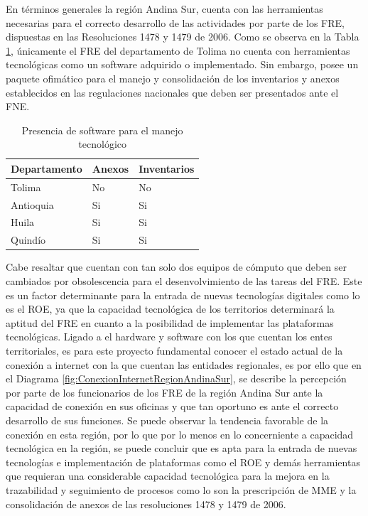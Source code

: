 \documentclass[
]{book}
\begin{document}
En términos generales la región Andina Sur, cuenta con las herramientas necesarias para el correcto desarrollo de las actividades por parte de los FRE, dispuestas en las Resoluciones 1478 y 1479 de 2006. Como se observa en la Tabla \ref{tab:softwareTecnologiaRegAndinaSur}, únicamente el FRE del departamento de Tolima no cuenta con herramientas tecnológicas como un software adquirido o implementado. Sin embargo, posee un paquete ofimático para el manejo y consolidación de los inventarios y anexos establecidos en las regulaciones nacionales que deben ser presentados ante el FNE.

\begin{longtable}[t]{lll}
\caption{\label{tab:softwareTecnologiaRegAndinaSur}Presencia de software para el manejo tecnológico}\\
\toprule
Departamento & Anexos & Inventarios\\
\midrule
Tolima & No & No\\
Antioquia & Si & Si\\
Huila & Si & Si\\
Quindío & Si & Si\\
\bottomrule
\end{longtable}

Cabe resaltar que cuentan con tan solo dos equipos de cómputo que deben ser cambiados por obsolescencia para el desenvolvimiento de las tareas del FRE. Este es un factor determinante para la entrada de nuevas tecnologías digitales como lo es el ROE, ya que la capacidad tecnológica de los territorios determinará la aptitud del FRE en cuanto a la posibilidad de implementar las plataformas tecnológicas.
Ligado a el hardware y software con los que cuentan los entes territoriales, es para este proyecto fundamental conocer el estado actual de la conexión a internet con la que cuentan las entidades regionales, es por ello que en el Diagrama \ref{fig:ConexionInternetRegionAndinaSur}, se describe la percepción por parte de los funcionarios de los FRE de la región Andina Sur ante la capacidad de conexión en sus oficinas y que tan oportuno es ante el correcto desarrollo de sus funciones. Se puede observar la tendencia favorable de la conexión en esta región, por lo que por lo menos en lo concerniente a capacidad tecnológica en la región, se puede concluir que es apta para la entrada de nuevas tecnologías e implementación de plataformas como el ROE y demás herramientas que requieran una considerable capacidad tecnológica para la mejora en la trazabilidad y seguimiento de procesos como lo son la prescripción de MME y la consolidación de anexos de las resoluciones 1478 y 1479 de 2006.
\end{document}
